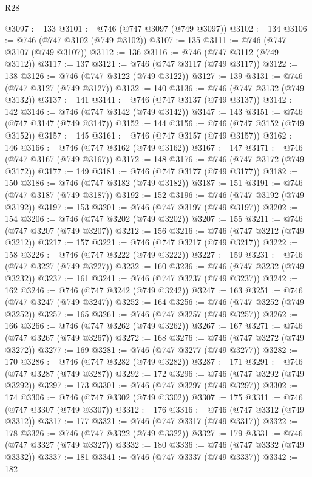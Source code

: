 \begin{lexlean}{R28}
\begin{coremodule}
@3097 := 133
@3101 := @746 (@747 @3097 (@749 @3097))
@3102 := 134
@3106 := @746 (@747 @3102 (@749 @3102))
@3107 := 135
@3111 := @746 (@747 @3107 (@749 @3107))
@3112 := 136
@3116 := @746 (@747 @3112 (@749 @3112))
@3117 := 137
@3121 := @746 (@747 @3117 (@749 @3117))
@3122 := 138
@3126 := @746 (@747 @3122 (@749 @3122))
@3127 := 139
@3131 := @746 (@747 @3127 (@749 @3127))
@3132 := 140
@3136 := @746 (@747 @3132 (@749 @3132))
@3137 := 141
@3141 := @746 (@747 @3137 (@749 @3137))
@3142 := 142
@3146 := @746 (@747 @3142 (@749 @3142))
@3147 := 143
@3151 := @746 (@747 @3147 (@749 @3147))
@3152 := 144
@3156 := @746 (@747 @3152 (@749 @3152))
@3157 := 145
@3161 := @746 (@747 @3157 (@749 @3157))
@3162 := 146
@3166 := @746 (@747 @3162 (@749 @3162))
@3167 := 147
@3171 := @746 (@747 @3167 (@749 @3167))
@3172 := 148
@3176 := @746 (@747 @3172 (@749 @3172))
@3177 := 149
@3181 := @746 (@747 @3177 (@749 @3177))
@3182 := 150
@3186 := @746 (@747 @3182 (@749 @3182))
@3187 := 151
@3191 := @746 (@747 @3187 (@749 @3187))
@3192 := 152
@3196 := @746 (@747 @3192 (@749 @3192))
@3197 := 153
@3201 := @746 (@747 @3197 (@749 @3197))
@3202 := 154
@3206 := @746 (@747 @3202 (@749 @3202))
@3207 := 155
@3211 := @746 (@747 @3207 (@749 @3207))
@3212 := 156
@3216 := @746 (@747 @3212 (@749 @3212))
@3217 := 157
@3221 := @746 (@747 @3217 (@749 @3217))
@3222 := 158
@3226 := @746 (@747 @3222 (@749 @3222))
@3227 := 159
@3231 := @746 (@747 @3227 (@749 @3227))
@3232 := 160
@3236 := @746 (@747 @3232 (@749 @3232))
@3237 := 161
@3241 := @746 (@747 @3237 (@749 @3237))
@3242 := 162
@3246 := @746 (@747 @3242 (@749 @3242))
@3247 := 163
@3251 := @746 (@747 @3247 (@749 @3247))
@3252 := 164
@3256 := @746 (@747 @3252 (@749 @3252))
@3257 := 165
@3261 := @746 (@747 @3257 (@749 @3257))
@3262 := 166
@3266 := @746 (@747 @3262 (@749 @3262))
@3267 := 167
@3271 := @746 (@747 @3267 (@749 @3267))
@3272 := 168
@3276 := @746 (@747 @3272 (@749 @3272))
@3277 := 169
@3281 := @746 (@747 @3277 (@749 @3277))
@3282 := 170
@3286 := @746 (@747 @3282 (@749 @3282))
@3287 := 171
@3291 := @746 (@747 @3287 (@749 @3287))
@3292 := 172
@3296 := @746 (@747 @3292 (@749 @3292))
@3297 := 173
@3301 := @746 (@747 @3297 (@749 @3297))
@3302 := 174
@3306 := @746 (@747 @3302 (@749 @3302))
@3307 := 175
@3311 := @746 (@747 @3307 (@749 @3307))
@3312 := 176
@3316 := @746 (@747 @3312 (@749 @3312))
@3317 := 177
@3321 := @746 (@747 @3317 (@749 @3317))
@3322 := 178
@3326 := @746 (@747 @3322 (@749 @3322))
@3327 := 179
@3331 := @746 (@747 @3327 (@749 @3327))
@3332 := 180
@3336 := @746 (@747 @3332 (@749 @3332))
@3337 := 181
@3341 := @746 (@747 @3337 (@749 @3337))
@3342 := 182

\end{coremodule}
\end{lexlean}
